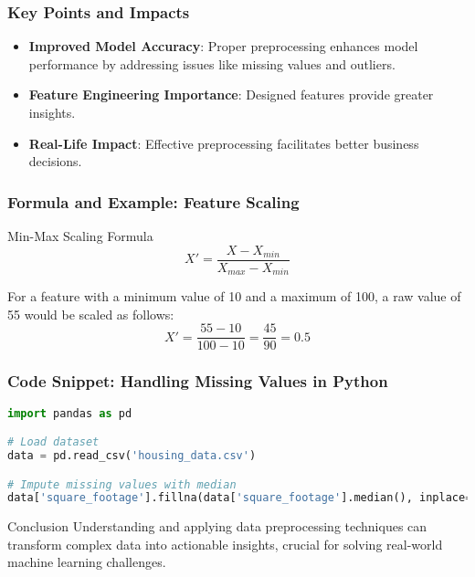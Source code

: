 \documentclass[aspectratio=169]{beamer}
\begin{document}
\begin{frame}[fragile]
    \frametitle{Key Points and Impacts}
    \begin{itemize}
        \item \textbf{Improved Model Accuracy}: Proper preprocessing enhances model performance by addressing issues like missing values and outliers.
        \item \textbf{Feature Engineering Importance}: Designed features provide greater insights.
        \item \textbf{Real-Life Impact}: Effective preprocessing facilitates better business decisions.
    \end{itemize}
\end{frame}

\begin{frame}[fragile]
    \frametitle{Formula and Example: Feature Scaling}
    \begin{block}{Min-Max Scaling Formula}
        \begin{equation}
            X' = \frac{X - X_{min}}{X_{max} - X_{min}}
        \end{equation}
    \end{block}
    \begin{example}
        For a feature with a minimum value of 10 and a maximum of 100, a raw value of 55 would be scaled as follows:
        \begin{equation}
            X' = \frac{55 - 10}{100 - 10} = \frac{45}{90} = 0.5
        \end{equation}
    \end{example}
\end{frame}

\begin{frame}[fragile]
    \frametitle{Code Snippet: Handling Missing Values in Python}
    \begin{lstlisting}[language=Python]
import pandas as pd

# Load dataset
data = pd.read_csv('housing_data.csv')

# Impute missing values with median
data['square_footage'].fillna(data['square_footage'].median(), inplace=True)
    \end{lstlisting}
    \begin{block}{Conclusion}
        Understanding and applying data preprocessing techniques can transform complex data into actionable insights, crucial for solving real-world machine learning challenges.
    \end{block}
\end{frame}
\end{document}
